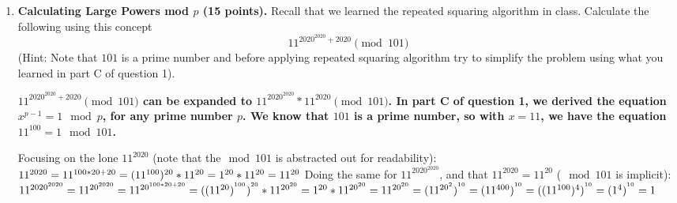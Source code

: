 \documentclass[11pt]{article}
\begin{document}
\begin{enumerate}
 \newpage 



\item {\bfseries Calculating Large Powers mod $p$ (15 points).} 
  Recall that we learned the repeated squaring algorithm in class. 
\newline 
  Calculate the following using this concept \newline
  $$ 11^{2020^{2020}+2020} \pmod{101} $$
  (Hint: Note that $101$ is a prime number and before applying repeated squaring algorithm try to simplify the problem using what you learned in part C of question 1). \newline 
  {\bfseries
      \newline
      \newline
      $11^{2020^{2020}+2020} \pmod{101}$ can be expanded to $11^{2020^{2020}} * 11^{2020} \pmod{101}$. \newline
      In part C of question 1, we derived the equation $x^{p-1}=1\mod p$, for any prime number $p$. We know that $101$ is a prime number, so with $x=11$, we have the equation $11^{100}=1\mod 101$. \newline

      Focusing on the lone $11^{2020}$ (note that the$\mod 101$ is abstracted out for readability): \newline
      $11^{2020} \newline
      =11^{100*20+20} \newline
      =(11^{100})^{20}*11^{20} \newline
      =1^{20}*11^{20} \newline
      =11^{20}$ \newline
      Doing the same for $11^{2020^{2020}}$, and that $11^{2020} = 11^{20}$ ($\mod 101$ is implicit): \newline
      $11^{2020^{2020}}\newline
      =11^{20^{2020}} \newline
      =11^{20^{100*20+20}} \newline
      =((11^{20})^{^{100}})^{^{20}}*11^{20^{20}} \newline
      =1^{20}*11^{20^{20}} \newline
      =11^{20^{20}} \newline
      =(11^{20^2})^{^{10}} \newline
      =(11^{400})^{^{10}} \newline
      =((11^{100})^{4})^{^{10}} \newline
      =(1^4)^{^{10}} \newline
      =1$

}
\end{enumerate}
\end{document}
